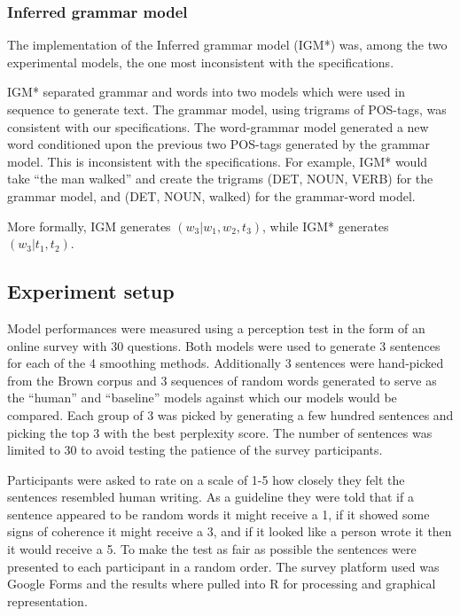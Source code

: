 \documentclass[a4paper,12pt]{article}
\begin{document}
\subsubsection{Inferred grammar model}
The implementation of the Inferred grammar model (IGM*) was, among the two experimental models, the one most inconsistent with the specifications.

IGM* separated grammar and words into two models which were used in sequence to generate text. The grammar model, using trigrams of POS-tags, was consistent with our specifications. The word-grammar model generated a new word conditioned upon the previous two POS-tags generated by the grammar model. This is inconsistent with the specifications. For example, IGM* would take ``the man walked'' and create the trigrams (DET, NOUN, VERB) for the grammar model, and (DET, NOUN, walked) for the grammar-word model.

More formally, IGM generates $(w_3|w_1,w_2,t_3)$, while IGM* generates $(w_3 | t_1,t_2)$.

\subsection{Experiment setup}
\label{sec:expiremental_setup}
Model performances were measured using a perception test in the form of an online survey with 30 questions. Both models were used to generate 3 sentences for each of the 4 smoothing methods.  Additionally 3 sentences were hand-picked from the Brown corpus and 3 sequences of random words generated to serve as the ``human'' and ``baseline'' models against which our models would be compared. Each group of 3 was picked by generating a few hundred sentences and picking the top 3 with the best perplexity score. The number of sentences was limited to 30 to avoid testing the patience of the survey participants.

Participants were asked to rate on a scale of 1-5 how closely they felt the sentences resembled human writing. As a guideline they were told that if a sentence appeared to be random words it might receive a 1, if it showed some signs of coherence it might receive a 3, and if it looked like a person wrote it then it would receive a 5. To make the test as fair as possible the sentences were presented to each participant in a random order. The survey platform used was Google Forms and the results where pulled into R for processing and graphical representation.
\end{document}
